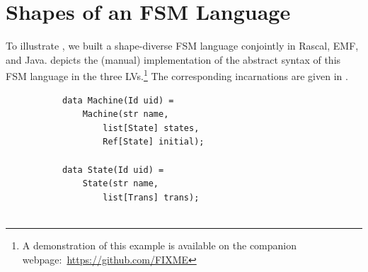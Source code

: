 \section{Shapes of an FSM Language}
\label{sec:eval}

To illustrate \prism, we built a shape-diverse FSM language conjointly in Rascal, EMF, and Java.
 depicts the (manual) implementation of the abstract syntax of this FSM language in the three LVs.\footnote{A demonstration of this example is available on the companion webpage:~\url{https://github.com/FIXME}}
The corresponding incarnations are given in .

\begin{figure}[bt]
	\centering
	\begin{subfigure}[b]{.3\columnwidth}
		\begin{lstlisting}[label=lst:fsm-adt, language=Rascal, numbers=none, xleftmargin=0pt, tabsize=1]
data Machine(Id uid) =
	Machine(str name,
		list[State] states,
		Ref[State] initial);

data State(Id uid) =
	State(str name,
		list[Trans] trans);


\end{lstlisting}
\end{subfigure}
\end{figure}
